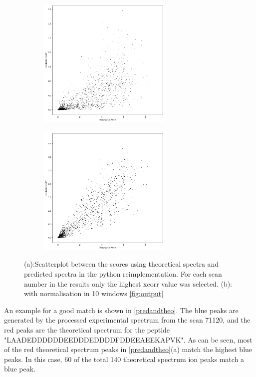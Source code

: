 \documentclass[11pt]{article}
\begin{document}
\begin{figure}
\centering
\begin{subfigure}[b]{1\textwidth}
    \includegraphics[width=0.7\textwidth]{figs/scatterplot_predicted_theoretical.png}
   \caption{}
   \label{fig:scatterplot_predicted_theoretical} 
\end{subfigure}
\begin{subfigure}[b]{1\textwidth}
   \includegraphics[width=0.7\textwidth]{figs/scatterplot_windows.png}
   \caption{}
   \label{fig:scatterplot_windows}
\end{subfigure}
\caption{(a):Scatterplot between the scores using theoretical spectra and predicted spectra in the python reimplementation. For each scan number in the results only the highest xcorr value was selected. (b): with normalisation in 10 windows \cref{fig:output}}
\label{scatterplot_python}
\end{figure}
An example for a good match is shown in \cref{predandtheo}. The blue peaks are generated by the processed experimental spectrum from the scan 71120, and the red peaks are the theoretical spectrum for the peptide "LAADEDDDDDDEEDDDEDDDDFDDEEAEEKAPVK". As can be seen, most of the red theoretical spectrum peaks in \cref{predandtheo}(a) match the highest blue peaks. In this case, 60 of the total 140 theoretical spectrum ion peaks match a blue peak. 
\end{document}
